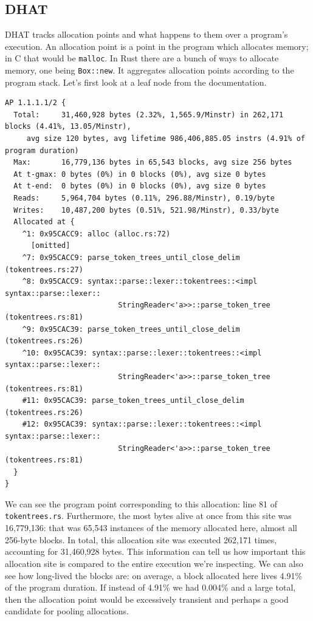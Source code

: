 \documentclass[a4paper]{report}
\begin{document}
\subsection*{DHAT}
DHAT tracks allocation points and what happens to them over a program's execution. An allocation point is a point in the program which allocates memory; in C that would be \texttt{malloc}. In Rust there are a bunch of ways to allocate memory, one being \texttt{Box::new}. It aggregates allocation points according to the program stack. Let's first look at a leaf node from the documentation.

\begin{verbatim}
AP 1.1.1.1/2 {
  Total:     31,460,928 bytes (2.32%, 1,565.9/Minstr) in 262,171 blocks (4.41%, 13.05/Minstr), 
     avg size 120 bytes, avg lifetime 986,406,885.05 instrs (4.91% of program duration)
  Max:       16,779,136 bytes in 65,543 blocks, avg size 256 bytes
  At t-gmax: 0 bytes (0%) in 0 blocks (0%), avg size 0 bytes
  At t-end:  0 bytes (0%) in 0 blocks (0%), avg size 0 bytes
  Reads:     5,964,704 bytes (0.11%, 296.88/Minstr), 0.19/byte
  Writes:    10,487,200 bytes (0.51%, 521.98/Minstr), 0.33/byte
  Allocated at {
    ^1: 0x95CACC9: alloc (alloc.rs:72)
      [omitted]
    ^7: 0x95CACC9: parse_token_trees_until_close_delim (tokentrees.rs:27)
    ^8: 0x95CACC9: syntax::parse::lexer::tokentrees::<impl syntax::parse::lexer::
                          StringReader<'a>>::parse_token_tree (tokentrees.rs:81)
    ^9: 0x95CAC39: parse_token_trees_until_close_delim (tokentrees.rs:26)
    ^10: 0x95CAC39: syntax::parse::lexer::tokentrees::<impl syntax::parse::lexer::
                          StringReader<'a>>::parse_token_tree (tokentrees.rs:81)
    #11: 0x95CAC39: parse_token_trees_until_close_delim (tokentrees.rs:26)
    #12: 0x95CAC39: syntax::parse::lexer::tokentrees::<impl syntax::parse::lexer::
                          StringReader<'a>>::parse_token_tree (tokentrees.rs:81)
  }
}
\end{verbatim}

We can see the program point corresponding to this allocation: line 81 of \texttt{tokentrees.rs}.
Furthermore, the most bytes alive at once from this site was 16,779,136: that was 65,543 instances of the
memory allocated here, almost all 256-byte blocks. In total, this allocation site was executed
262,171 times, accounting for 31,460,928 bytes. This information can tell us how important this
allocation site is compared to the entire execution we're inspecting. We can also see how long-lived
the blocks are: on average, a block allocated here lives 4.91\% of the program duration. If instead of
4.91\% we had 0.004\% and a large total, then the allocation point would be excessively transient and perhaps
a good candidate for pooling allocations.
\end{document}
